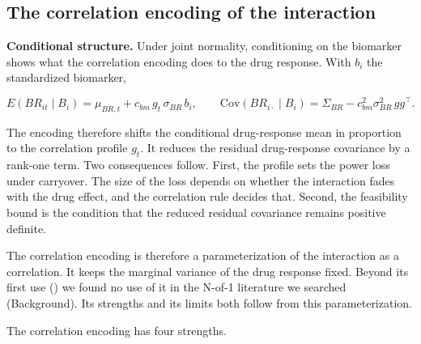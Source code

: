 \documentclass[
  11pt,
]{article}
\begin{document}
\subsection{The correlation encoding of the interaction}\label{the-correlation-encoding-of-the-interaction}

\textbf{Conditional structure.} Under joint normality, conditioning on the
biomarker shows what the correlation encoding does to the drug
response. With \(b_i\) the standardized biomarker,

\[E(BR_{it} \mid B_i) = \mu_{BR,t} + c_{bm}\, g_t\, \sigma_{BR}\, b_i,
\qquad
\mathrm{Cov}(BR_{i\cdot} \mid B_i) = \Sigma_{BR} - c_{bm}^2\sigma_{BR}^2\, g g^\top .\]

The encoding therefore shifts the conditional drug-response mean in
proportion to the correlation profile \(g_t\). It reduces the residual
drug-response covariance by a rank-one term. Two consequences follow.
First, the profile sets the power loss under carryover. The size of
the loss depends on whether the interaction fades with the drug
effect, and the correlation rule decides that. Second, the
feasibility bound is the condition that the reduced residual
covariance remains positive definite.

The correlation encoding is therefore a parameterization of the
interaction as a correlation. It keeps the marginal variance of the
drug response fixed. Beyond its first use () we found
no use of it in the N-of-1 literature we searched (Background). Its
strengths and its limits both follow from this parameterization.

The correlation encoding has four strengths.
\end{document}
